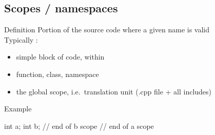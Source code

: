 \subsection[NS]{Scopes / namespaces}

\begin{frame}[fragile]
  \begin{block}{Definition}
    Portion of the source code where a given name is valid \\
    Typically :
    \begin{itemize}
    \item simple block of code, within \texttt{{}}
    \item function, class, namespace
    \item the global scope, i.e.\ translation unit (.cpp file + all includes)
    \end{itemize}
  \end{block}
  \begin{exampleblock}{Example}
    \begin{cppcode*}{}
      { int a;
        { int b;
        } // end of b scope
      } // end of a scope
    \end{cppcode*}
  \end{exampleblock}
\end{frame}

